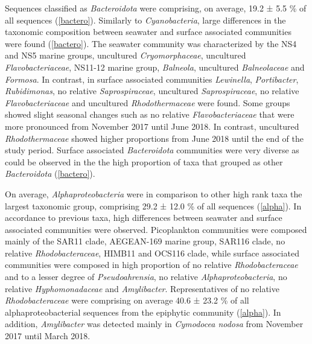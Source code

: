 \documentclass[12pt,]{article}
\begin{document}
Sequences classified as \emph{Bacteroidota} were comprising, on average,
19.2 ± 5.5 \si{\percent} of all sequences (\autoref{bactero}). Similarly
to \emph{Cyanobacteria}, large differences in the taxonomic composition
between seawater and surface associated communities were found
(\autoref{bactero}). The seawater community was characterized by the NS4
and NS5 marine groups, uncultured \emph{Cryomorphaceae}, uncultured
\emph{Flavobacteriaceae}, NS11-12 marine group, \emph{Balneola},
uncultured \emph{Balneolaceae} and \emph{Formosa}. In contrast, in
surface associated communities \emph{Lewinella}, \emph{Portibacter},
\emph{Rubidimonas}, no relative \emph{Saprospiraceae}, uncultured
\emph{Saprospiraceae}, no relative \emph{Flavobacteriaceae} and
uncultured \emph{Rhodothermaceae} were found. Some groups showed slight
seasonal changes such as no relative \emph{Flavobacteriaceae} that were
more pronounced from November 2017 until June 2018. In contrast,
uncultured \emph{Rhodothermaceae} showed higher proportions from June
2018 until the end of the study period. Surface associated
\emph{Bacteroidota} communities were very diverse as could be observed
in the the high proportion of taxa that grouped as other
\emph{Bacteroidota} (\autoref{bactero}).

On average, \emph{Alphaproteobacteria} were in comparison to other high
rank taxa the largest taxonomic group, comprising 29.2 ± 12.0
\si{\percent} of all sequences (\autoref{alpha}). In accordance to
previous taxa, high differences between seawater and surface associated
communities were observed. Picoplankton communities were composed mainly
of the SAR11 clade, AEGEAN-169 marine group, SAR116 clade, no relative
\emph{Rhodobacteraceae}, HIMB11 and OCS116 clade, while surface
associated communities were composed in high proportion of no relative
\emph{Rhodobacteraceae} and to a lesser degree of \emph{Pseudoahrensia},
no relative \emph{Alphaproteobacteria}, no relative
\emph{Hyphomonadaceae} and \emph{Amylibacter}. Representatives of no
relative \emph{Rhodobacteraceae} were comprising on average 40.6 ± 23.2
\si{\percent} of all alphaproteobacterial sequences from the epiphytic
community (\autoref{alpha}). In addition, \emph{Amylibacter} was
detected mainly in \emph{Cymodocea nodosa} from November 2017 until
March 2018.
\end{document}
